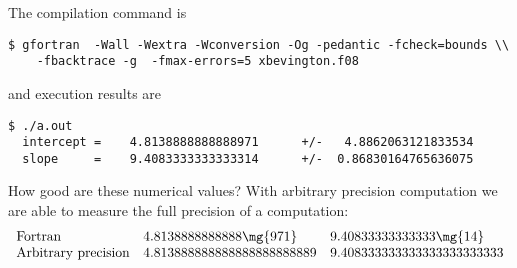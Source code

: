 %
%
%
%
%
%
%
%

The compilation command is
{\footnotesize{
\begin{verbatim}
$ gfortran  -Wall -Wextra -Wconversion -Og -pedantic -fcheck=bounds \\
    -fbacktrace -g  -fmax-errors=5 xbevington.f08
\end{verbatim}}}
and execution results are
{\footnotesize{
\begin{verbatim}
$ ./a.out
  intercept =    4.8138888888888971      +/-   4.8862063121833534
  slope     =    9.4083333333333314      +/-  0.86830164765636075
\end{verbatim}}}
How good are these numerical values? With arbitrary precision computation we are able to measure the full precision of a computation:
  \begin{equation*}   %
    \begin{array}{lll}
       \text{Fortran}             & 4.8138888888888\mg{971}    & 9.40833333333333\mg{14} \\
       \text{Arbitrary precision} & 4.813888888888888888888889 & 9.408333333333333333333333
    \end{array}
  \end{equation*}
 
